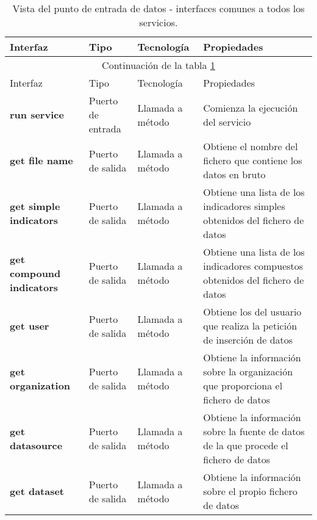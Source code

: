 \begin{longtable}[c]{|p{25mm}|p{20mm}|p{30mm}|p{60mm}|}
 \caption{Vista del punto de entrada de datos - interfaces comunes a todos los servicios.\label{interfaces_receiver_services}}\\
 \hline
 	Interfaz & Tipo & Tecnología & Propiedades\\
 \hline
 \hline
 \endfirsthead
 \hline
 \multicolumn{4}{|c|}{Continuación de la tabla \ref{interfaces_receiver_services}}\\
 \hline
 	Interfaz & Tipo & Tecnología & Propiedades\\
 \hline
 \hline
 \endhead
 \hline
 \endfoot
 
 	\textbf{run service} & Puerto de entrada & Llamada a método & Comienza la ejecución del servicio \\
 	\hline
 	
 	\textbf{get file name} & Puerto de salida & Llamada a método & Obtiene el nombre del fichero que contiene los datos en bruto \\
 	\hline
 	
 	\textbf{get simple indicators} & Puerto de salida & Llamada a método & Obtiene una lista de los indicadores simples obtenidos del fichero de datos \\
 	\hline
 	
 	\textbf{get compound indicators} & Puerto de salida & Llamada a método & Obtiene una lista de los indicadores compuestos obtenidos del fichero de datos \\
 	\hline
 	
  	\textbf{get user} & Puerto de salida & Llamada a método & Obtiene los del usuario que realiza la petición de inserción de datos \\
  	\hline
  	
  	\textbf{get organization} & Puerto de salida & Llamada a método & Obtiene la información sobre la organización que proporciona el fichero de datos \\
  	\hline
  	
   	\textbf{get datasource} & Puerto de salida & Llamada a método & Obtiene la información sobre la fuente de datos de la que procede el fichero de datos \\
   	\hline
   	
   	\textbf{get dataset} & Puerto de salida & Llamada a método & Obtiene la información sobre el propio fichero de datos\\
   	\hline
   	

\end{longtable}
